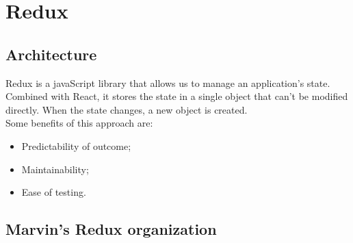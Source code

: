 \documentclass[ManualeSviluppatore]{subfiles}
\begin{document}
\chapter{Redux}
\section{Architecture}
Redux is a javaScript library that allows us to manage an application's state. \\ 
Combined with React, it stores the state in a single object that can't be modified directly. When the state changes, a new object is created. \\
Some benefits of this approach are:
\begin{itemize}
	\item Predictability of outcome;
	\item Maintainability;
	\item Ease of testing.
\end{itemize}

\section{Marvin's Redux organization} %
	
	\newpage
	
	\newpage
	
	\newpage
	
	\newpage
	
	\newpage
		
	\newpage	
\end{document}
